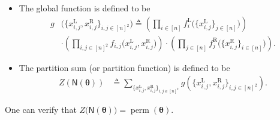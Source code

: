 \documentclass[conference]{IEEEtran}
\theoremstyle{plain}
\theoremstyle{definition}
\newcommand{\sfn}{\mathsf{N}}
\newcommand{\fr}[1]{ f^{\mathrm{R}}_{ #1 } }
\newcommand{\fl}[1]{ f^{\mathrm{L}}_{ #1 } }
\newcommand{\fe}[1]{ f_{ #1 }}
\newcommand{\xr}[1]{ x^{\mathrm{R}}_{ #1 } }
\newcommand{\xl}[1]{ x^{\mathrm{L}}_{ #1 } }
\newcommand{\perm}{\operatorname{perm}}
\newcommand{\btheta}{\boldsymbol{\theta}}
\newcommand{\defeq}{\triangleq}
\begin{document}
\begin{itemize}
 \item The global function is defined to be
 \begin{align*}
  g & \bigl(\{\xl{i,j},\xr{i,j}\}_{i,j\in[n]^2}\bigr)
  \defeq
  \left(\prod_{i \in [n]}\fl{i}\bigl(\{\xl{i,j}\}_{j\in[n]}\bigr)\right) \\
    &
  \cdot\left(\prod_{i,j \in [n]^2}\fe{i,j}\bigl(\xl{i,j},\xr{i,j}\bigr)\right)
  \cdot\left(\prod_{j \in [n]}\fr{j}\bigl(\{\xr{i,j}\}_{i\in[n]}\bigr)\right).
 \end{align*}
 \item The partition sum (or partition function) is defined to be
 \begin{align*}
  Z(\sfn(\btheta)) & \defeq\sum_{\{\xl{i,j},\xr{i,j}\}_{i,j\in[n]^2}} g(\{\xl{i,j},\xr{i,j}\}_{i,j\in[n]^2}).
 \end{align*}
\end{itemize}
One can verify that $Z\bigl( \sfn(\btheta) \bigr) = \perm(\btheta)$.

\end{document}
